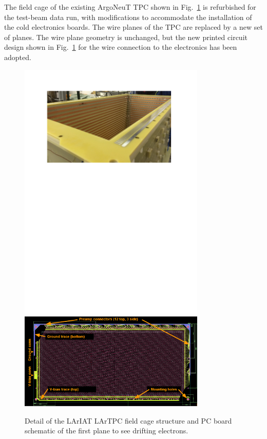 \documentclass[DIV=calc, paper=a4, fontsize=10pt, twocolumn]{scrartcl}	 %
\begin{document}
{The field cage of the existing ArgoNeuT TPC shown in Fig.~\ref{fig:fieldcage-wireplane} is refurbished for the test-beam data run, with modifications to accommodate the installation of the cold electronics boards. The wire planes of the TPC are replaced by  a new set of planes.  The wire plane geometry is unchanged, but the new printed circuit design shown in Fig.~\ref{fig:fieldcage-wireplane} for the wire connection to the electronics has been adopted.
\begin{figure}[h!]
\begin{centering}
\includegraphics[width=3.5in]{Figures/TPC-ready}
\includegraphics[width=3.5in]{Figures/wire-plane-new}
\caption{ {\scriptsize \sf Detail of the LArIAT LArTPC field cage structure and PC board schematic of the first plane to see drifting electrons.}}
\label{fig:fieldcage-wireplane}
\end{centering}

\end{figure}}
\end{document}
